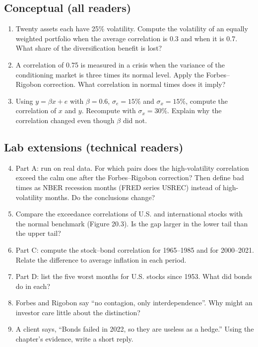 \subsection*{Conceptual (all readers)}

\begin{enumerate}
  \item Twenty assets each have 25\% volatility. Compute the volatility of an equally weighted portfolio when the average correlation is 0.3 and when it is 0.7. What share of the diversification benefit is lost?
  \item A correlation of 0.75 is measured in a crisis when the variance of the conditioning market is three times its normal level. Apply the Forbes--Rigobon correction. What correlation in normal times does it imply?
  \item Using $y = \beta x + e$ with $\beta = 0.6$, $\sigma_e = 15\%$ and $\sigma_x = 15\%$, compute the correlation of $x$ and $y$. Recompute with $\sigma_x = 30\%$. Explain why the correlation changed even though $\beta$ did not.
\end{enumerate}

\subsection*{Lab extensions (technical readers)}

\begin{enumerate}
  \setcounter{enumi}{3}
  \item Part A: run on real data. For which pairs does the high-volatility correlation exceed the calm one after the Forbes--Rigobon correction? Then define bad times as NBER recession months (FRED series USREC) instead of high-volatility months. Do the conclusions change?
  \item Compare the exceedance correlations of U.S. and international stocks with the normal benchmark (Figure 20.3). Is the gap larger in the lower tail than the upper tail?
  \item Part C: compute the stock--bond correlation for 1965--1985 and for 2000--2021. Relate the difference to average inflation in each period.
  \item Part D: list the five worst months for U.S. stocks since 1953. What did bonds do in each?
  \item Forbes and Rigobon say ``no contagion, only interdependence''. Why might an investor care little about the distinction?
  \item A client says, ``Bonds failed in 2022, so they are useless as a hedge.'' Using the chapter's evidence, write a short reply.
\end{enumerate}

